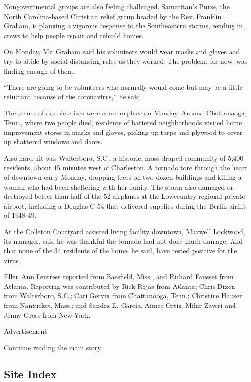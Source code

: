 Nongovernmental groups are also feeling challenged. Samaritan's Purse,
the North Carolina-based Christian relief group headed by the Rev.
Franklin Graham, is planning a vigorous response to the Southeastern
storms, sending in crews to help people repair and rebuild homes.

On Monday, Mr. Graham said his volunteers would wear masks and gloves
and try to abide by social distancing rules as they worked. The problem,
for now, was finding enough of them.

``There are going to be volunteers who normally would come but may be a
little reluctant because of the coronavirus,'' he said.

The scenes of double crises were commonplace on Monday. Around
Chattanooga, Tenn., where two people died, residents of battered
neighborhoods visited home improvement stores in masks and gloves,
picking up tarps and plywood to cover up shattered windows and doors.

Also hard-hit was Walterboro, S.C., a historic, moss-draped community of
5,400 residents, about 45 minutes west of Charleston. A tornado tore
through the heart of downtown early Monday, dropping trees on two dozen
buildings and killing a woman who had been sheltering with her family.
The storm also damaged or destroyed better than half of the 52 airplanes
at the Lowcountry regional private airport, including a Douglas C-54
that delivered supplies during the Berlin airlift of 1948-49.

At the Colleton Courtyard assisted living facility downtown, Maxwell
Lockwood, its manager, said he was thankful the tornado had not done
much damage. And that none of the 34 residents of the home, he said,
have tested positive for the virus.

Ellen Ann Fentress reported from Bassfield, Miss., and Richard Fausset
from Atlanta. Reporting was contributed by Rick Rojas from Atlanta;
Chris Dixon from Walterboro, S.C.; Cari Gervin from Chattanooga, Tenn.;
Christine Hauser from Nantucket, Mass.; and Sandra E. Garcia, Aimee
Ortiz, Mihir Zaveri and Jenny Gross from New York.

Advertisement

\protect\hyperlink{after-bottom}{Continue reading the main story}

\hypertarget{site-index}{%
\subsection{Site Index}\label{site-index}}

